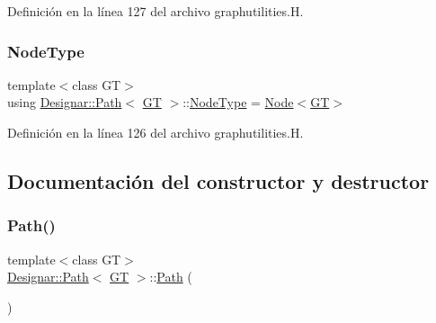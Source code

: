Definición en la línea 127 del archivo graphutilities.\+H.

\mbox{\label{class_designar_1_1_path_a7b499fd50e96e3360968d4cfef7a3736}} 
\subsubsection{\texorpdfstring{Node\+Type}{NodeType}}
{\footnotesize\ttfamily template$<$class GT$>$ \\
using \hyperlink{class_designar_1_1_path}{Designar\+::\+Path}$<$ \hyperlink{demo-buildgraph_8_c_a3001c40d2c31ca87ed96cd7d1334a55e}{GT} $>$\+::\hyperlink{class_designar_1_1_path_a7b499fd50e96e3360968d4cfef7a3736}{Node\+Type} =  \hyperlink{namespace_designar_a5af326c65aa2bd26b26c410f2030d09e}{Node}$<$\hyperlink{demo-buildgraph_8_c_a3001c40d2c31ca87ed96cd7d1334a55e}{GT}$>$}



Definición en la línea 126 del archivo graphutilities.\+H.



\subsection{Documentación del constructor y destructor}
\mbox{\label{class_designar_1_1_path_a47a3b5f01fba6977f57ad84fb6f1fda9}} 
\subsubsection{\texorpdfstring{Path()}{Path()}\hspace{0.1cm}{\footnotesize\ttfamily [1/4]}}
{\footnotesize\ttfamily template$<$class GT$>$ \\
\hyperlink{class_designar_1_1_path}{Designar\+::\+Path}$<$ \hyperlink{demo-buildgraph_8_c_a3001c40d2c31ca87ed96cd7d1334a55e}{GT} $>$\+::\hyperlink{class_designar_1_1_path}{Path} (\begin{DoxyParamCaption}{ }\end{DoxyParamCaption})\hspace{0.3cm}{\ttfamily [inline]}}



